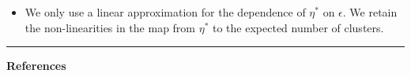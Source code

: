\documentclass[a0,plainsections,30pt]{sciposter}\usepackage[]{graphicx}\usepackage[]{color}
\newcommand{\Expect}{\mathbb{E}}
\newcommand{\etazopt}{\eta_z^{*}}
\newcommand{\etathetaopt}{\eta_\theta^{*}}
\newcommand{\QExpect}
{\Expect_{q\left(\theta, z \vert \eta_\theta, \etazopt(\eta_\theta)\right)}}
\newcommand{\atzero}{\Big\rvert_{\eta_\theta = \etathetaopt, \epsilon = 0}}
\begin{document}
\begin{minipage}[t]{0.45\textwidth}
\begin{itemize}
\item We only use a linear approximation for the dependence of $\eta^*$ on $\epsilon$. We retain the non-linearities in the map from $\eta^*$ to the expected number of clusters.


\end{itemize}

\begin{center}
\noindent\rule{0.6\textwidth}{1pt}
\end{center}
{\bf References}
\renewcommand{\section}[2]{}%
\footnotesize{
  
  
}

\end{minipage}
\hfill \vrule \hfill
\end{document}
